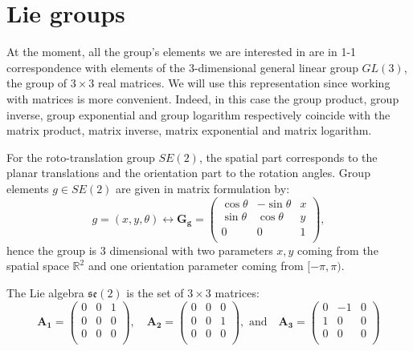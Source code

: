 \documentclass{article}
\begin{document}
\section{Lie groups} \label{app:lie_groups}

At the moment, all the group's elements we are interested in are in 1-1 correspondence with elements of the 3-dimensional general linear group $GL(3)$, the group of $3 \times 3$ real matrices. We will use this representation since working with matrices is more convenient. Indeed, in this case the group product, group inverse, group exponential and group logarithm respectively coincide with the matrix product, matrix inverse, matrix exponential and matrix logarithm.

For the roto-translation group  $SE(2)$, the spatial part corresponds to the planar translations and the orientation part to the rotation angles. Group elements $g \in SE(2)$ are given in matrix formulation by:
\begin{equation}
g = (x, y, \theta) \leftrightarrow
\boldsymbol{G_g} =
\left(
\begin{array}{ccc}
\cos \theta & - \sin \theta & x \\
\sin \theta & \cos \theta & y \\
0 & 0 & 1 \\
\end{array}
\right),
\end{equation}
hence the group is 3 dimensional with two parameters $x,y$ coming from the spatial space $\mathbb{R}^2$ and one orientation parameter coming from $[-\pi, \pi)$.

The Lie algebra $\mathfrak{se}(2)$ is the set of $3 \times 3$ matrices:
\begin{equation}
\boldsymbol{A_1} =
\left(
\begin{array}{ccc}
0 & 0 & 1 \\
0 & 0 & 0 \\
0 & 0 & 0 \\
\end{array}
\right)
, \quad
\boldsymbol{A_2} =
\left(
\begin{array}{ccc}
0 & 0 & 0  \\
0 & 0 & 1 \\
0 & 0 & 0 \\
\end{array}
\right)
, \text{ and} \quad
\boldsymbol{A_3} =
\left(
\begin{array}{ccc}
0 & -1 & 0 \\
1 & 0 & 0 \\
0 & 0 & 0 \\
\end{array}
\right)
\end{equation}
\end{document}
